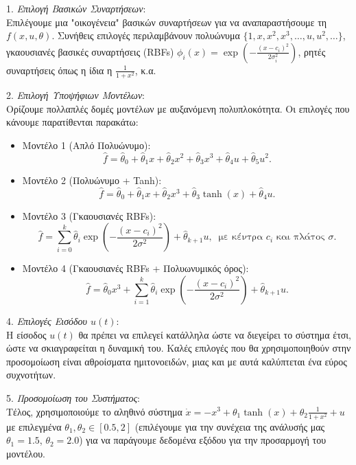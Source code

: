 \documentclass[12pt]{article} %
\numberwithin{equation}{section}  %
\begin{document}
1. \textit{Επιλογή Βασικών Συναρτήσεων}: \\
Επιλέγουμε μια "οικογένεια" βασικών συναρτήσεων για να αναπαραστήσουμε τη \(f(x, u, \theta)\). 
Συνήθεις επιλογές περιλαμβάνουν 
πολυώνυμα \( \{1, x, x^2, x^3, \dots, u, u^2, \dots\} \), 
γκαουσιανές βασικές συναρτήσεις (RBFs) \(\phi_i(x) = \exp\left(-\frac{(x - c_i)^2}{2\sigma_i^2}\right)\),
ρητές συναρτήσεις όπως η ίδια η \(\frac{1}{1 + x^2}\), κ.α.


2. \textit{Επιλογή Υποψήφιων Μοντέλων}: \\
Ορίζουμε πολλαπλές δομές μοντέλων με αυξανόμενη πολυπλοκότητα. Οι επιλογές που κάνουμε παρατίθενται παρακάτω:
\begin{itemize}[noitemsep, nolistsep]
    \item Μοντέλο 1 (Απλό Πολυώνυμο): 
    $$\hat{f} = \hat{\theta}_0 + \hat{\theta}_1 x + \hat{\theta}_2 x^2 + \hat{\theta}_3 x^3 + \hat{\theta}_4 u + \hat{\theta}_5 u^2.$$
    
    \item Μοντέλο 2 (Πολυώνυμο + Tanh): 
    $$\hat{f} = \hat{\theta}_0 + \hat{\theta}_1 x + \hat{\theta}_2 x^3 + \hat{\theta}_3 \tanh(x) + \hat{\theta}_4 u.$$
    
    \item Μοντέλο 3 (Γκαουσιανές RBFs): 
    $$\hat{f} = \sum_{i=0}^k \hat{\theta}_i \exp\left(-\frac{(x - c_i)^2}{2\sigma^2}\right) + \hat{\theta}_{k+1} u,\ \text{ με κέντρα \(c_i\) και πλάτος \(\sigma\)}.$$

    \item Μοντέλο 4 (Γκαουσιανές RBFs + Πολυωνυμικός όρος): 
    $$\hat{f} = \hat{\theta}_0 x^3 + \sum_{i=1}^k \hat{\theta}_i \exp\left(-\frac{(x - c_i)^2}{2\sigma^2}\right) + \hat{\theta}_{k+1} u.$$
\end{itemize}

4. \textit{Επιλογές Εισόδου \(u(t)\)}: \\ 
Η είσοδος \(u(t)\) θα πρέπει να επιλεγεί κατάλληλα ώστε να διεγείρει το σύστημα έτσι, ώστε να σκιαγραφείται η δυναμική του. 
Καλές επιλογές που θα χρησιμοποιηθούν στην προσομοίωση είναι αθροίσματα ημιτονοειδών, μιας και με αυτά καλύπτεται ένα εύρος συχνοτήτων. 

5. \textit{Προσομοίωση του Συστήματος}: \\
Τέλος, χρησιμοποιούμε το αληθινό σύστημα \(\dot{x} = -x^3 + \theta_1 \tanh(x) + \theta_2 \frac{1}{1+x^2} + u\) με επιλεγμένα \(\theta_1, \theta_2 \in [0.5, 2]\) (επιλέγουμε για την συνέχεια της ανάλυσής μας \(\theta_1 = 1.5\), \(\theta_2 = 2.0\)) 
για να παράγουμε δεδομένα εξόδου για την προσαρμογή του μοντέλου. 
\end{document}
